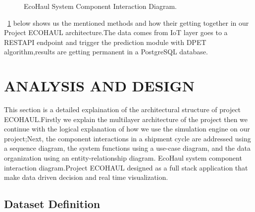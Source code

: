 \documentclass[12pt,a4paper]{report}
\begin{document}
\begin{figure}[H]
\centering
{}
\caption{EcoHaul System Component Interaction Diagram.}
\label{fig:component_interaction}
\end{figure}


\Fig~\ref{fig:component_interaction} below shows us the mentioned methods and how their getting together in our Project ECOHAUL architecture.The data comes from IoT layer goes to a RESTAPI endpoint and trigger the prediction module with DPET algorithm,results are getting permanent in a PostgreSQL database.
\chapter{ANALYSIS AND DESIGN}

\indent This section is a  detailed explaination of the architectural structure of project ECOHAUL.Firstly  we explain the multilayer architecture of the project then we continue with the logical explanation of how we use the simulation engine on our project;Next, the component interactions in a shipment cycle are addressed using a sequence diagram, the system functions using a use-case diagram, and the data organization using an entity-relationship diagram. EcoHaul system component interaction diagram.Project ECOHAUL designed as a full stack application that make data driven decision and real time visualization.

\section{Dataset Definition}
\end{document}
